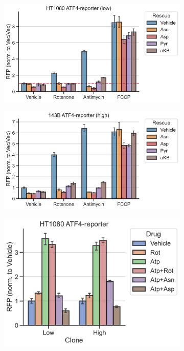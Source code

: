\begin{figure}[ht]
     \centering
     \begin{subfigure}[b]{0.49\textwidth}
         \includegraphics[width=\textwidth]{figures/chap2/app/HT1080_ETCinhib_ATF4rep_low.pdf}
         \caption{}
         \label{fig:app_ch2:HT1080_ETCinhib_ATF4rep_low}
     \end{subfigure}
     \hfill
     \begin{subfigure}[b]{0.49\textwidth}
         \includegraphics[width=\textwidth]{figures/chap2/app/143B_ETCinhib_ATF4rep_high.pdf}
         \caption{}
         \label{fig:app_ch2:143B_ETCinhib_ATF4rep_high}
     \end{subfigure}
     \hfill
     \begin{subfigure}[b]{0.4\textwidth}
         \includegraphics[width=\textwidth]{figures/chap2/app/HT1080_Atp_ATF4rep.pdf}

\end{subfigure}
\end{figure}
